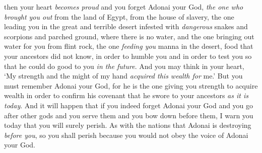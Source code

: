 \begin{biblechapter}
\verse then your heart \textit{becomes proud} and you forget Adonai your God, \textit{the one who brought you out} from the land of Egypt, from the house of slavery,
\verse the one leading you in the great and terrible desert infested with \textit{dangerous} snakes and scorpions and parched ground, where there is no water, and the one bringing out water for you from flint rock,
\verse the one \textit{feeding you} manna in the desert, food that your ancestors did not know, in order to humble you and in order to test you so that he could do good to you \textit{in the future}.
\verse And you may think in your heart, ‘My strength and the might of my hand \textit{acquired this wealth for} me.’
\verse But you must remember Adonai your God, for he is the one giving you strength to acquire wealth in order to confirm his covenant that he swore to your ancestors \textit{as it is today}.
\verse And it will happen that if you indeed forget Adonai your God and you go after other gods and you serve them and you bow down before them, I warn you today that you will surely perish.
\verse As with the nations that Adonai is destroying \textit{before you}, so you shall perish because you would not obey the voice of Adonai your God.
\end{biblechapter}


